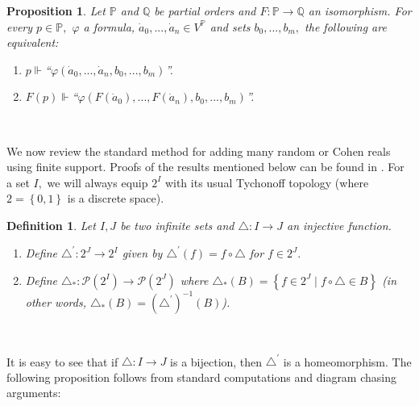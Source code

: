 \documentclass{article}%
\newtheorem{definition}[theorem]{Definition}
\newtheorem{proposition}[theorem]{Proposition}
\begin{document}
\begin{proposition}
Let $\mathbb{P}$ and $\mathbb{Q}$ be partial orders and
$F:\mathbb{P\longrightarrow Q}$ an isomorphism. For every $p\in\mathbb{P},$
$\varphi$ a formula, $\dot{a}_{0},...,\dot{a}_{n}\in V^{\mathbb{P}}$ and sets
$b_{0},...,b_{m},$ the following are equivalent:
\label{Prop formula isomorfismo}

\begin{enumerate}
\item $p\Vdash$\textquotedblleft$\varphi(\dot{a}_{0},...,\dot{a}_{n}%
,b_{0},...,b_{m})$\textquotedblright.

\item $F\left(  p\right)  \Vdash$\textquotedblleft$\varphi(F\left(  \dot
{a}_{0}\right)  ,...,F\left(  \dot{a}_{n}\right)  ,b_{0},...,b_{m}%
)$\textquotedblright.\ 
\end{enumerate}
\end{proposition}

\qquad\qquad\qquad\ \ 

We now review the standard method for adding many random or Cohen reals using
finite support. Proofs of the results mentioned below can be found in
\cite{KunenCohenyRandom}. For a set $I,$ we will always equip $2^{I}$ with its
usual Tychonoff topology (where $2=\left\{  0,1\right\}  $ is a discrete space).

\begin{definition}
Let $I,J$ be two infinite sets and $\triangle:I\longrightarrow J$ an injective function.

\begin{enumerate}
\item Define $\triangle^{\prime}:2^{J}\longrightarrow2^{I}$ given by
$\triangle^{\prime}\left(  f\right)  =f\circ\triangle$ for $f\in2^{J}.$

\item Define $\triangle_{\ast}:\mathcal{P}\left(  2^{I}\right)
\longrightarrow\mathcal{P}\left(  2^{J}\right)  $ where $\triangle_{\ast
}\left(  B\right)  =\left\{  f\in2^{J}\mid f\circ\triangle\in B\right\}  $ (in
other words, $\triangle_{\ast}\left(  B\right)  =\left(  \triangle^{\prime
}\right)  ^{-1}\left(  B\right)  $).
\end{enumerate}
\end{definition}

\qquad\qquad\ \ \ \ 

It is easy to see that if $\triangle:I\longrightarrow J$ is a bijection, then
$\triangle^{\prime}$ is a homeomorphism. The following proposition follows
from standard computations and diagram chasing arguments:
\end{document}
